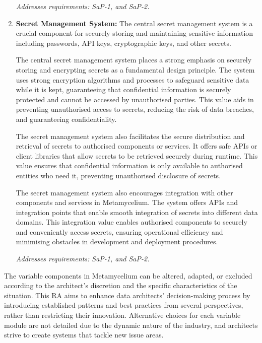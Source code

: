 \documentclass[preprint,12pt]{elsarticle}
\begin{document}
\begin{enumerate}
    \textit{Addresses requirements: SaP-1, and SaP-2.} 
    

    \item \textbf{Secret Management System:} The central secret management system is a crucial component for securely storing and maintaining sensitive information including passwords, API keys, cryptographic keys, and other secrets.
    
    The central secret management system places a strong emphasis on securely storing and encrypting secrets as a fundamental design principle. The system uses strong encryption algorithms and processes to safeguard sensitive data while it is kept, guaranteeing that confidential information is securely protected and cannot be accessed by unauthorised parties. This value aids in preventing unauthorised access to secrets, reducing the risk of data breaches, and guaranteeing confidentiality.
    
    The secret management system also facilitates the secure distribution and retrieval of secrets to authorised components or services. It offers safe APIs or client libraries that allow secrets to be retrieved securely during runtime. This value ensures that confidential information is only available to authorised entities who need it, preventing unauthorised disclosure of secrets.
    
    The secret management system also encourages integration with other components and services in Metamycelium. The system offers APIs and integration points that enable smooth integration of secrets into different data domains. This integration value enables authorised components to securely and conveniently access secrets, ensuring operational efficiency and minimising obstacles in development and deployment procedures.
    
    \textit{Addresses requirements: SaP-1, and SaP-2.} 

\end{enumerate}

The variable components in Metamycelium can be altered, adapted, or excluded according to the architect's discretion and the specific characteristics of the situation. This RA aims to enhance data architects' decision-making process by introducing established patterns and best practices from several perspectives, rather than restricting their innovation. Alternative choices for each variable module are not detailed due to the dynamic nature of the industry, and architects strive to create systems that tackle new issue areas. 
\end{document}
